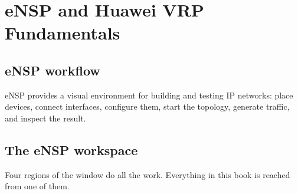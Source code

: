 \chapter{eNSP and Huawei VRP Fundamentals}\label{ch:ensp-vrp}

\section{eNSP workflow}
eNSP provides a visual environment for building and testing IP networks: place devices, connect interfaces, configure them, start the topology, generate traffic, and inspect the result.


\section{The eNSP workspace}
Four regions of the window do all the work. Everything in this book is
reached from one of them.

